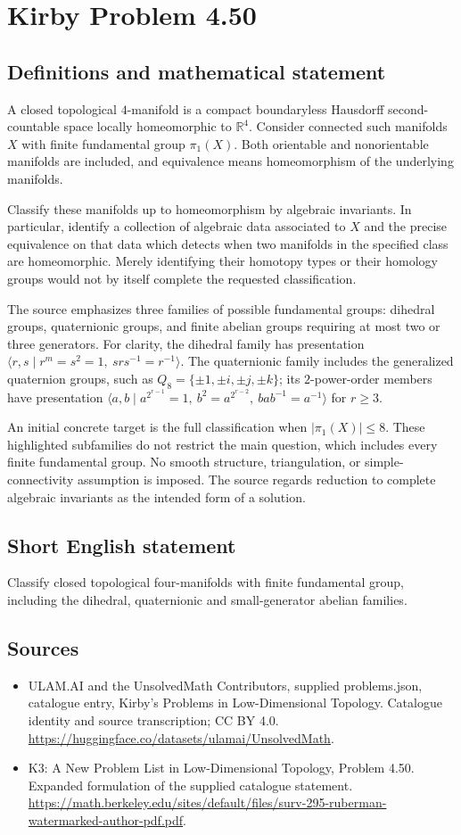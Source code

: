 \documentclass[11pt,a4paper]{article}
\begin{document}
\section*{Kirby Problem 4.50}\label{statement}

\subsection{Definitions and mathematical statement}
A closed topological $4$-manifold is a compact boundaryless Hausdorff
second-countable space locally homeomorphic to $\mathbb R^4$.
Consider connected such manifolds $X$ with finite fundamental group
$\pi_1(X)$. Both orientable and nonorientable manifolds are included,
and equivalence means homeomorphism of the underlying manifolds.

Classify these manifolds up to homeomorphism by algebraic invariants.
In particular, identify a collection of algebraic data associated to
$X$ and the precise equivalence on that data which detects when two
manifolds in the specified class are homeomorphic. Merely identifying
their homotopy types or their homology groups would not by itself
complete the requested classification.

The source emphasizes three families of possible fundamental groups:
dihedral groups, quaternionic groups, and finite abelian groups
requiring at most two or three generators. For clarity, the dihedral
family has presentation
$\langle r,s\mid r^m=s^2=1,\ srs^{-1}=r^{-1}\rangle$.
The quaternionic family includes the generalized quaternion groups,
such as $Q_8=\{\pm1,\pm i,\pm j,\pm k\}$; its $2$-power-order
members have presentation
$\langle a,b\mid a^{2^{r-1}}=1,\ b^2=a^{2^{r-2}},\ bab^{-1}=a^{-1}\rangle$
for $r\ge3$.

An initial concrete target is the full classification when
$|\pi_1(X)|\le8$. These highlighted subfamilies do not restrict the
main question, which includes every finite fundamental group.
No smooth structure, triangulation, or simple-connectivity assumption
is imposed. The source regards reduction to complete algebraic
invariants as the intended form of a solution.
\subsection{Short English statement}
Classify closed topological four-manifolds with finite fundamental group, including the dihedral, quaternionic and small-generator abelian families.
\subsection{Sources}
\begin{itemize}
\item[S1] ULAM.AI and the UnsolvedMath Contributors, supplied problems.json, catalogue entry, Kirby's Problems in Low-Dimensional Topology. Catalogue identity and source transcription; CC BY 4.0.
\url{https://huggingface.co/datasets/ulamai/UnsolvedMath}.
\item[S2] K3: A New Problem List in Low-Dimensional Topology, Problem 4.50. Expanded formulation of the supplied catalogue statement.
\url{https://math.berkeley.edu/sites/default/files/surv-295-ruberman-watermarked-author-pdf.pdf}.
\end{itemize}
\end{document}
